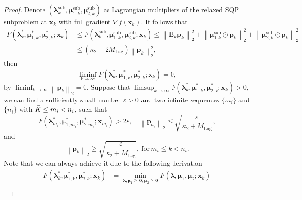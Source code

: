 \documentclass[aos]{imsart}
\numberwithin{equation}{section}
\theoremstyle{plain}
\begin{document}
\begin{appendix}
\begin{proof}
    Denote $(\bm{\lambda}_{k}^{\text{sub}}, \bm{\mu}_{1,k}^{\text{sub}}, \bm{\mu}_{2,k}^{\text{sub}})$ as Lagrangian multipliers of the relaxed SQP subproblem at $\bm{x}_k$ with full gradient $\nabla f(\bm{x}_k)$. It follows that
    \begin{equation*}
        \begin{split}
            F(\bm{\lambda}_{k}^{*}, \bm{\mu}_{1,k}^{*}, \bm{\mu}_{2,k}^{*}; \bm{x}_k) & \leq F(\bm{\lambda}_{k}^{\text{sub}}, \bm{\mu}_{1,k}^{\text{sub}}, \bm{\mu}_{2,k}^{\text{sub}}; \bm{x}_k) \leq \left\| \bm{B}_k \bm{p}_k \right\|_2^2 + \left\| \bm{\mu}_{1,k}^{\text{sub}} \odot \bm{p}_k \right\|_2^2 + \left\| \bm{\mu}_{2,k}^{\text{sub}} \odot \bm{p}_k \right\|_2^2 \\
            & \leq (\kappa_2 + 2 M_{\text{Lag}}) \left\| \bm{p}_k \right\|_2^2,
        \end{split}
    \end{equation*}
    then 
    \begin{equation*}
        \mathop{\lim \inf}_{k \to \infty}  F(\bm{\lambda}_{k}^{*}, \bm{\mu}_{1,k}^{*}, \bm{\mu}_{2,k}^{*}; \bm{x}_k)  = 0,
    \end{equation*}
    by $\mathop{\lim \inf}_{k \to \infty} \left\| \bm{p}_k \right\|_2 = 0$. Suppose that $\mathop{\lim \sup}_{k \to \infty}  F(\bm{\lambda}_{k}^{*}, \bm{\mu}_{1,k}^{*}, \bm{\mu}_{2,k}^{*}; \bm{x}_k)  > 0$, we can find a sufficiently small number $\varepsilon >0$ and two infinite sequences $\{m_i\}$ and $\{n_i\}$ with $\Bar{K} \leq m_i < n_i$, such that
    \begin{equation*}
        F(\bm{\lambda}_{m_i}^{*}, \bm{\mu}_{1,m_i}^{*}, \bm{\mu}_{2,m_i}^{*}; \bm{x}_{m_i}) > 2 \varepsilon, \quad \left\| \bm{p}_{n_i} \right\|_2 \leq \sqrt{\frac{\varepsilon}{\kappa_2 + M_{\text{Lag}} }},
    \end{equation*}
    and
    \begin{equation*}
        \left\| \bm{p}_{k} \right\|_2 \geq \sqrt{\frac{\varepsilon}{\kappa_2 + M_{\text{Lag}} }},~\text{for}~m_i \leq k < n_i.
    \end{equation*}
    Note that we can always achieve it due to the following derivation
    \begin{equation}
        \begin{split}
            F(\bm{\lambda}_{k}^{*}, \bm{\mu}_{1,k}^{*}, \bm{\mu}_{2,k}^{*}; \bm{x}_{k}) & = \min_{\bm{\lambda}, \bm{\mu}_{1} \geq \bm{0}, \bm{\mu}_{2} \geq \bm{0}} F(\bm{\lambda}, \bm{\mu}_{1}, \bm{\mu}_2; \bm{x}_k) \\

\end{split}
\end{equation}
\end{proof}
\end{appendix}
\end{document}
